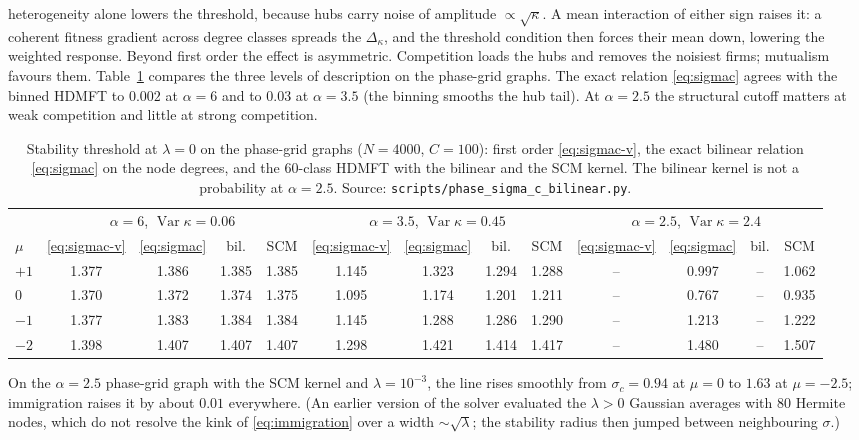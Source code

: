 \documentclass[11pt]{article}
\newcommand{\Var}{\operatorname{Var}}
\begin{document}
heterogeneity alone lowers the threshold, because hubs carry noise of amplitude $\propto\sqrt\kappa$.
A mean interaction of either sign raises it: a coherent fitness gradient across degree classes
spreads the $\Delta_\kappa$, and the threshold condition then forces their mean down, lowering the
weighted response.  Beyond first order the effect is asymmetric.  Competition loads the hubs and
removes the noisiest firms; mutualism favours them.  Table~\ref{tab:sigmac} compares the three
levels of description on the phase-grid graphs.  The exact relation \eqref{eq:sigmac} agrees with
the binned HDMFT to $0.002$ at $\alpha=6$ and to $0.03$ at $\alpha=3.5$ (the binning smooths the hub
tail).  At $\alpha=2.5$ the structural cutoff matters at weak competition and little at strong
competition.

\begin{table}[htbp]
\centering\small\setlength{\tabcolsep}{4pt}
\begin{tabular}{l|cccc|cccc|cccc}
\toprule
 & \multicolumn{4}{c|}{$\alpha=6$, $\Var\kappa=0.06$} & \multicolumn{4}{c|}{$\alpha=3.5$, $\Var\kappa=0.45$} & \multicolumn{4}{c}{$\alpha=2.5$, $\Var\kappa=2.4$}\\
$\mu$ & \eqref{eq:sigmac-v} & \eqref{eq:sigmac} & bil. & SCM & \eqref{eq:sigmac-v} & \eqref{eq:sigmac} & bil. & SCM & \eqref{eq:sigmac-v} & \eqref{eq:sigmac} & bil. & SCM\\
\midrule
$+1$ & 1.377 & 1.386 & 1.385 & 1.385 & 1.145 & 1.323 & 1.294 & 1.288 & -- & 0.997 & -- & 1.062\\
$0$  & 1.370 & 1.372 & 1.374 & 1.375 & 1.095 & 1.174 & 1.201 & 1.211 & -- & 0.767 & -- & 0.935\\
$-1$ & 1.377 & 1.383 & 1.384 & 1.384 & 1.145 & 1.288 & 1.286 & 1.290 & -- & 1.213 & -- & 1.222\\
$-2$ & 1.398 & 1.407 & 1.407 & 1.407 & 1.298 & 1.421 & 1.414 & 1.417 & -- & 1.480 & -- & 1.507\\
\bottomrule
\end{tabular}
\caption{Stability threshold at $\lambda=0$ on the phase-grid graphs ($N=4000$, $C=100$): first
order \eqref{eq:sigmac-v}, the exact bilinear relation \eqref{eq:sigmac} on the node degrees, and
the 60-class HDMFT with the bilinear and the SCM kernel.  The bilinear kernel is not a probability
at $\alpha=2.5$.  Source: \texttt{scripts/phase\_sigma\_c\_bilinear.py}.}
\label{tab:sigmac}
\end{table}

On the $\alpha=2.5$ phase-grid graph with the SCM kernel and $\lambda=10^{-3}$, the line rises
smoothly from $\sigma_c=0.94$ at $\mu=0$ to $1.63$ at $\mu=-2.5$; immigration raises it by about
$0.01$ everywhere.  (An earlier version of the solver evaluated the $\lambda>0$ Gaussian averages
with 80 Hermite nodes, which do not resolve the kink of \eqref{eq:immigration} over a width
$\sim\sqrt\lambda$; the stability radius then jumped between neighbouring $\sigma$.)
\end{document}
